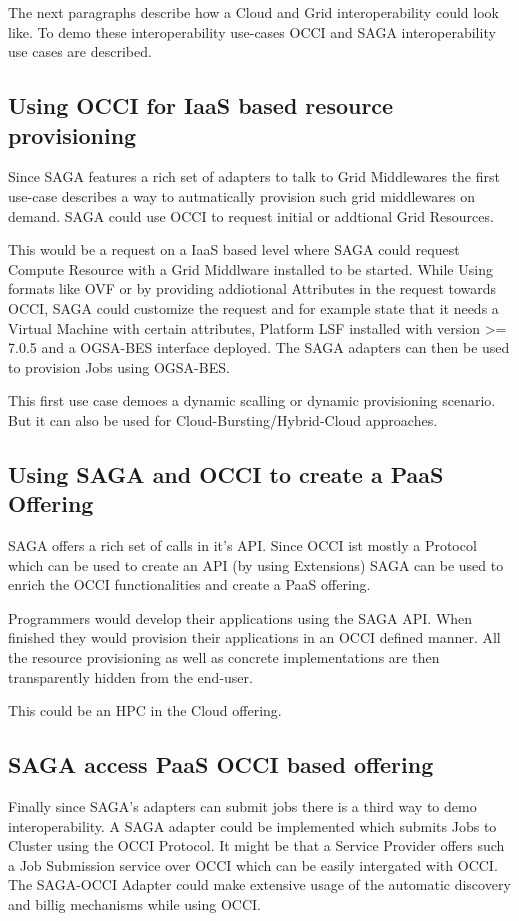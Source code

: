 \documentclass[10pt,conference,final,letterpaper,twoside,twocolumn,]{IEEEtran}
\begin{document}
 The next paragraphs describe how a Cloud and Grid interoperability
 could look like. To demo these interoperability use-cases OCCI and
 SAGA interoperability use cases are described.

 \subsection{Using OCCI for IaaS based resource provisioning} Since
 SAGA features a rich set of adapters to talk to Grid Middlewares the
 first use-case describes a way to autmatically provision such grid
 middlewares on demand. SAGA could use OCCI to request initial or
 addtional Grid Resources.

This would be a request on a IaaS based level where SAGA could request
Compute Resource with a Grid Middlware installed to be started. While
Using formats like OVF or by providing addiotional Attributes in the
request towards OCCI, SAGA could customize the request and for example
state that it needs a Virtual Machine with certain attributes,
Platform LSF installed with version >= 7.0.5 and a OGSA-BES interface
deployed. The SAGA adapters can then be used to provision Jobs using
OGSA-BES.

This first use case demoes a dynamic scalling or dynamic provisioning
scenario. But it can also be used for Cloud-Bursting/Hybrid-Cloud
approaches.

\subsection{Using SAGA and OCCI to create a PaaS Offering}
SAGA offers a rich set of calls in it's API. Since OCCI ist mostly a
Protocol which can be used to create an API (by using Extensions) SAGA
can be used to enrich the OCCI functionalities and create a PaaS
offering.

Programmers would develop their applications using the SAGA API. When
finished they would provision their applications in an OCCI defined
manner. All the resource provisioning as well as concrete
implementations are then transparently hidden from the end-user.

This could be an HPC in the Cloud offering.

\subsection{SAGA access PaaS OCCI based offering}
Finally since SAGA's adapters can submit jobs there is a third way to
demo interoperability. A SAGA adapter could be implemented which
submits Jobs to Cluster using the OCCI Protocol. It might be that a
Service Provider offers such a Job Submission service over OCCI which
can be easily intergated with OCCI. The SAGA-OCCI Adapter could make
extensive usage of the automatic discovery and billig mechanisms while
using OCCI.
\end{document}
